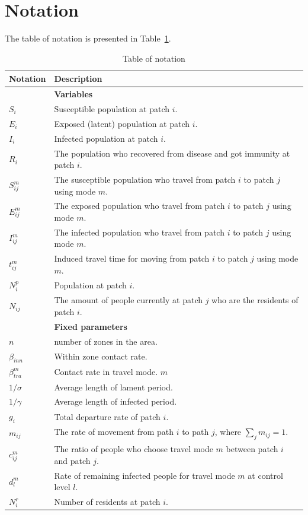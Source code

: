 \documentclass[review]{elsarticle}
\theoremstyle{plain}
\theoremstyle{definition}
\theoremstyle{remark}
\numberwithin{equation}{section}
\theoremstyle{remark}
\begin{document}
\section{Notation}
The table of notation is presented in Table~\ref{notation}.
\begin{table}[h]
	\centering
	\caption{Table of notation}
	\label{notation}
	\begin{tabular}{p{3cm}p{13cm}}
		\hline
		Notation & Description \\ \hline
		&\textbf{Variables}\\ \hline
		$S_i$ & Susceptible population at patch $i$. \\
		$E_i$ & Exposed (latent) population at patch $i$.\\
		$I_i$ & Infected population at patch $i$. \\
		$R_i$ & The population who recovered from disease and got immunity at patch $i$.\\
		$S_{ij}^m$ & The susceptible population who travel from patch $i$ to patch $j$ using mode $m$. \\
		$E_{ij}^m$ & The exposed population who travel from patch $i$ to patch $j$ using mode $m$. \\
		$I_{ij}^m$ & The infected population who travel from patch $i$ to patch $j$ using mode $m$. \\
		$t_{ij}^m$ & Induced travel time for moving from patch $i$ to patch $j$ using mode $m$. \\
		$N_i^p$ & Population at patch $i$. \\
		$N_{ij}$ & The amount of people currently at patch $j$ who are the residents of patch $i$. \\
		\hline
		&\textbf{Fixed parameters}\\ \hline
        $n$ & number of zones in the area. \\
		$\beta_{inn}$ & Within zone contact rate. \\
		$\beta_{tra}^m$ & Contact rate in travel mode. $m$ \\ 
		$1/\sigma $ & Average length of lament period. \\
		$1/\gamma $ & Average length of infected period.\\
		$g_i$ & Total departure rate of patch $i$.\\
		$m_{ij}$ & The rate of movement from path $i$ to path $j$, where $\sum_j m_{ij}=1$. \\
		$c_{ij}^m$ & The ratio of people who choose travel mode $m$ between patch $i$ and patch $j$. \\
		$d_l^m$ & Rate of remaining infected people for travel mode $m$ at control level $l$. \\
		$N_i^r$ & Number of residents at patch $i$. \\ \hline
	\end{tabular}
\end{table}
\end{document}
